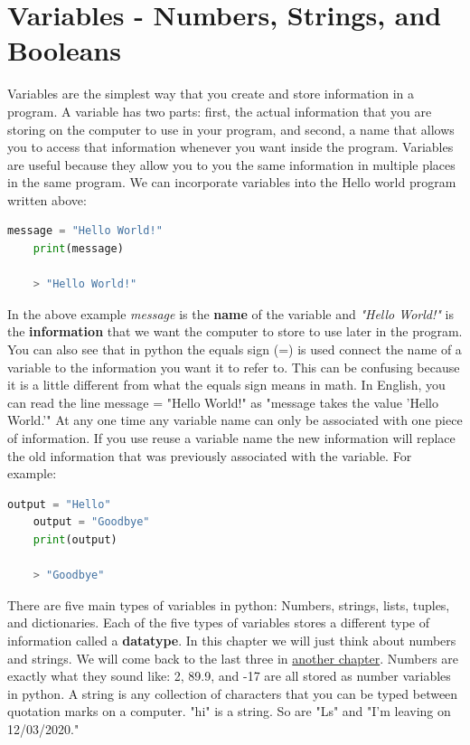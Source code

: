 \documentclass[]{article}
\begin{document}
\section{ Variables - Numbers, Strings, and Booleans}

Variables are the simplest way that you create and store information in a program. A variable has two parts: first, the actual information that you are storing on the computer to use in your program, and second, a name that allows you to access that information whenever you want inside the program.  Variables are useful because they allow you to you the same information in multiple places in the same program.  We can incorporate variables into the Hello world program written above:
\begin{lstlisting}[language=Python]
    message = "Hello World!"
    print(message)

    > "Hello World!"
\end{lstlisting}
In the above example \textit{message} is the \textbf{name} of the variable and \textit{"Hello World!"} is the \textbf{information} that we want the computer to store to use later in the program.  You can also see that in python the equals sign (=) is used connect the name of a variable to the information you want it to refer to.  This can be confusing because it is a little different from what the equals sign means in math.  In English, you can read the line message = "Hello World!" as "message takes the value 'Hello World.'" At any one time any variable name can only be associated with one piece of information. If you use reuse a variable name the new information will replace the old information that was previously associated with the variable. For example:

\begin{lstlisting}[language=python]
    output = "Hello"
    output = "Goodbye"
    print(output)
    
    > "Goodbye"
\end{lstlisting}



There are five main types of variables in python: Numbers, strings, lists, tuples, and dictionaries.  Each of the five types of variables stores a different type of information called a \textbf{datatype}.  In this chapter we will just think about numbers and strings. We will come back to the last three in \hyperref[sec:lists-tuples-dictionaries]{another chapter}. Numbers are exactly what they sound like: 2, 89.9, and -17 are all stored as number variables in python. A string is any collection of characters that you can be typed between quotation marks on a computer.  "hi" is a string.  So are "Ls" and "I'm leaving on 12/03/2020."   
\end{document}
